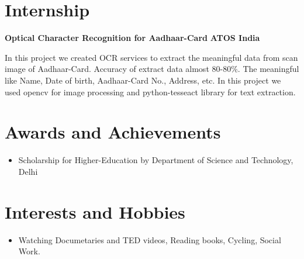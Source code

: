 \documentclass{article}
\begin{document}
\vspace*{.5cm}
\section{Internship}
\textbf{\large{Optical Character Recognition for Aadhaar-Card}} \hspace*{6cm} \textbf{ATOS India}

\vspace*{.051mm}
\hspace*{2.6mm} In this project we created OCR services to extract the meaningful data from scan image of Aadhaar-Card. Accuracy of extract data almost 80-80$\%.$ The meaningful like Name, Date of birth, Aadhaar-Card No., Address, etc. In this project we used opencv for image processing and python-tesseact library for text extraction.\\

\vspace*{.4cm}
\section{Awards and Achievements}
\begin{itemize}
\item Scholarship for Higher-Education by Department of Science and Technology, Delhi
\end{itemize}

\vspace*{.1cm}
\section{Interests and Hobbies}
\begin{itemize}
\item Watching Documetaries and TED videos, Reading books, Cycling, Social Work.
\end{itemize}
%
\end{document}
